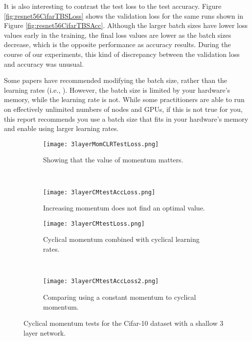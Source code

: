\documentclass{article} %
\begin{document}
It is also interesting to contrast the test loss to the test accuracy.  Figure \ref{fig:resnet56CifarTBSLoss} shows the validation loss for the same runs shown in Figure \ref{fig:resnet56CifarTBSAcc}.  Although the larger batch sizes have lower loss values early in the training, the final loss values are lower as the batch sizes decrease, which is the opposite performance as accuracy results.  During the course of our experiments, this kind of discrepancy between the validation loss and accuracy was unusual. 
 
Some papers have recommended modifying the batch size, rather than the learning rates (i.e., \cite{smith2017don,jastrzkebski2017three}).  However, the batch size is limited by your hardware's memory, while the learning rate is not.  While some practitioners are able to run on effectively unlimited numbers of nodes and GPUs, if this is not true for you, this report recommends you use a batch size that fits in your hardware's memory and enable using larger learning rates.  




\begin{figure}[tbh]
	\centering
	\begin{subfigure}[b]{0.5\textwidth}
		\texttt{[image: 3layerMomCLRTestLoss.png]}
		\caption{Showing that the value of momentum matters.}
		\label{fig:3layerMomCLRTestLoss}       %
	\end{subfigure}
	\quad
	\hfill
	~ %
	\centering
	\begin{subfigure}[b]{0.43\textwidth}
		\texttt{[image: 3layerCMtestAccLoss.png]}
		\caption{Increasing momentum does not find an optimal value.}
		\label{fig:3layerCMtestAccLoss}       %
	\end{subfigure}
	\centering
	\begin{subfigure}[b]{0.5\textwidth}
		\texttt{[image: 3layerCMtestLoss.png]}
		\caption{Cyclical momentum combined with cyclical learning rates.}
		\label{fig:3layerCMtestLoss}       %
	\end{subfigure}
	\quad
	\hfill
	~ %
	\centering
	\begin{subfigure}[b]{0.43\textwidth}
		\texttt{[image: 3layerCMtestAccLoss2.png]}
		\caption{Comparing using a constant momentum to cyclical momentum.}
		\label{fig:3layerCMtestAccLoss2}       %
	\end{subfigure}
	\caption{Cyclical momentum tests for the Cifar-10 dataset with a shallow 3 layer network.}
	\label{fig:cyclicalMomentum2}
	\vspace{-10pt}	
\end{figure}
\end{document}
